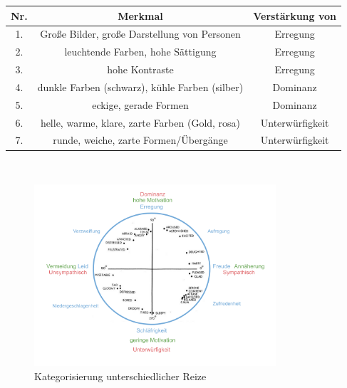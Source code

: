 \documentclass[./dokumentation.tex]{subfiles}
\begin{document}
\begin{center}
    \begin{tabular}{c | c | c}
            Nr. & Merkmal                                         & Verstärkung von \\
            \hline
            1.  & Große Bilder, große Darstellung von Personen    & Erregung \\
            2.  & leuchtende Farben, hohe Sättigung               & Erregung\\
            3.  & hohe Kontraste                                  & Erregung\\
            4.  & dunkle Farben (schwarz), kühle Farben (silber)  & Dominanz\\
            5.  & eckige, gerade Formen                           & Dominanz\\
            6.  & helle, warme, klare, zarte Farben  (Gold, rosa) & Unterwürfigkeit\\
            7.  & runde, weiche, zarte Formen/Übergänge           & Unterwürfigkeit\\
    \end{tabular} \\
\end{center}

\begin{figure}[H]
    \centering
    \includegraphics[width=0.8\textwidth]{bilder/dom-unt-bild.png}
    \caption{Kategorisierung unterschiedlicher Reize}
    \label{fig11:dom-unt}
\end{figure}\\
\end{document}
